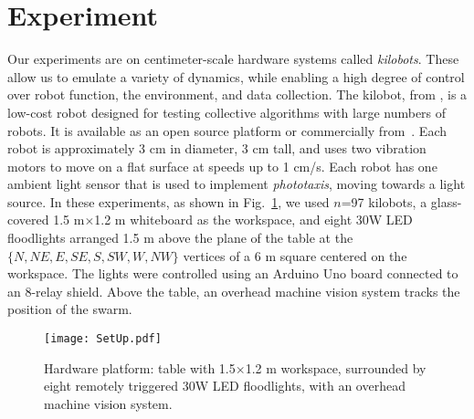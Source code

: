 
\section{Experiment}\label{sec:expResults}





Our experiments are on centimeter-scale hardware systems called \emph{kilobots}.  These allow us to emulate a variety of dynamics, while enabling a high degree of control over robot function, the environment, and data collection. The kilobot, from \cite{Rubenstein2012,rubenstein2014programmable}, is a low-cost robot designed for testing collective algorithms with large numbers of robots. It is available as an open source platform or commercially from~\cite{K-Team2015}.  Each robot is approximately 3 cm in diameter, 3 cm tall, and uses two vibration motors to move on a flat surface at speeds up to 1 cm/s.  Each robot has one ambient light sensor that is used to implement \emph{phototaxis},  moving towards a light source. 
In these experiments, as shown in Fig.~\ref{fig:setup}, we used $n$=97 kilobots, a glass-covered 1.5 m$\times$1.2 m whiteboard as the workspace, and eight 30W LED floodlights arranged 1.5 m above the plane of the table at the $\{N,NE,E,SE,S,SW,W,NW\}$ vertices of a 6 m square centered on the workspace. The lights were controlled using an Arduino Uno board connected to an 8-relay shield.  Above  the table, an overhead machine vision system tracks the position of the swarm.


\begin{figure}
\begin{center}
	\texttt{[image: SetUp.pdf]}
\end{center}
\vspace{-1em}
\caption{\label{fig:setup}
Hardware platform:  table with 1.5$\times$1.2 m workspace, surrounded by eight remotely triggered 30W LED floodlights, with an overhead machine vision system.
}
\vspace{-1.5em}
\end{figure}

